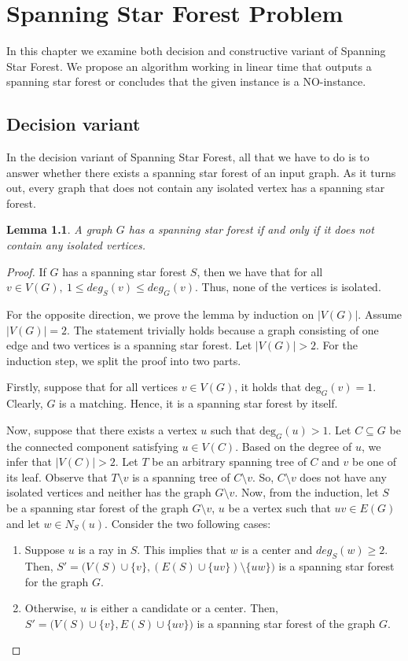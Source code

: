 \documentclass[en]{pracamgr}
\newtheorem{lemma}{Lemma}
\theoremstyle{definition}
\newcommand{\ssf}{spanning star forest}
\newcommand{\ssfp}{{\sc Spanning Star Forest}}
\newcommand{\degree}[2]{\textrm{deg}_{#1}(#2)}
\begin{document}
\chapter{Spanning Star Forest Problem}\label{sec3}

In this chapter we examine both decision and constructive variant of \ssfp{}. We propose an algorithm working in linear time that outputs a \ssf{} or concludes that the given instance is a NO-instance.

\section{Decision variant}

In the decision variant of \ssfp{}, all that we have to do is to answer whether there exists a spanning star forest of an input graph. As it turns out, every graph that does not contain any isolated vertex has a \ssf{}.

\begin{lemma}\label{SSF lemma}
 A graph $G$ has a \ssf{} if and only if it does not contain any isolated vertices.
\end{lemma}

\begin{proof}
	If $G$ has a \ssf{} $S$, then we have that for all $v \in V(G),\ 1 \leq deg_S(v) \leq deg_G(v)$. Thus, none of the vertices is isolated.
	
	For the opposite direction, we prove the lemma by induction on $|V(G)|$. Assume $|V(G)|=2$. The statement trivially holds because a graph consisting of one edge and two vertices is a \ssf{}. Let $|V(G)| >2$. For the induction step, we split the proof into two parts. 
	
	Firstly, suppose that for all vertices $v \in V(G)$, it holds that $\degree{G}{v}=1$.  Clearly, $G$ is a matching. Hence, it is a \ssf{} by itself. 
	
	Now, suppose that there exists a vertex $u$ such that $\degree{G}{u}>1$. Let $C \subseteq G$ be the connected component satisfying $u \in V(C)$. Based on the degree of $u$, we infer that $|V(C)|>2$. Let $T$ be an arbitrary spanning tree of $C$ and $v$ be one of its leaf. Observe that $T \setminus v$ is a spanning tree of $C \setminus v$. So, $C \setminus v$ does not have any isolated vertices and neither has the graph $G \setminus v$. Now, from the induction, let $S$ be a \ssf{} of the graph $G \setminus v$, $u$ be a vertex such that $uv \in E(G)$ and let $w \in N_S(u)$. Consider the two following cases:
	\begin{enumerate}
		\item Suppose $u$ is a ray in $S$. This implies that $w$ is a center and $deg_S(w) \geq 2$. Then, $S'=\big(V(S) \cup \{v\},(E(S) \cup \{uv\}) \setminus \{uw\}\big)$ is a spanning star forest for the graph $G$.
		\item Otherwise, $u$ is either a candidate or a center. Then, $S'=\big(V(S) \cup \{v\}, E(S) \cup \{uv\}\big)$ is a spanning star forest of the graph $G$. \qedhere
	\end{enumerate}
	
\end{proof}
\end{document}
